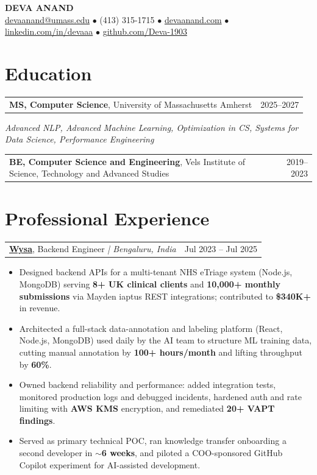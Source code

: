 \documentclass[letterpaper,11pt]{article}
\makeatletter
\newcommand{\eduItem}[3]{%
  \begin{tabular*}{\textwidth}{@{}l@{\extracolsep{\fill}}r@{}}
    \textbf{#1}, #2 & #3 \\
  \end{tabular*}\par
}
\newcommand{\expItem}[4]{%
  \vspace{3pt}
  \begin{tabular*}{\textwidth}{@{}l@{\extracolsep{\fill}}r@{}}
    \textbf{#1}, #2 \textit{| #3} & #4 \\
  \end{tabular*}\par\vspace{-2pt}
}
\makeatother
\begin{document}
\begin{center}
    {\fontsize{18}{20}\selectfont\bfseries DEVA ANAND}\\ \vspace{3pt}
    {\small
    \href{mailto:devaanand@umass.edu}{devaanand@umass.edu}
    \enspace$\bullet$\enspace
    (413) 315-1715
    \enspace$\bullet$\enspace
    \href{https://devaanand.com}{devaanand.com}
    \enspace$\bullet$\enspace
    \href{https://linkedin.com/in/devaaa/}{linkedin.com/in/devaaa}
    \enspace$\bullet$\enspace
    \href{https://github.com/Deva-1903}{github.com/Deva-1903}}
\end{center}
\vspace{-6pt}

\section{Education}
\eduItem{MS, Computer Science}{University of Massachusetts Amherst}{2025--2027}
{\small\textit{Advanced NLP, Advanced Machine Learning, Optimization in CS, Systems for Data Science, Performance Engineering}}\par
\vspace{3pt}
\eduItem{BE, Computer Science and Engineering}{Vels Institute of Science, Technology and Advanced Studies}{2019--2023}

\section{Professional Experience}

\expItem{\href{https://www.wysa.io}{Wysa}}{Backend Engineer}{Bengaluru, India}{Jul 2023 -- Jul 2025}
\begin{itemize}
  \item Designed backend APIs for a multi-tenant NHS eTriage system (Node.js, MongoDB) serving \textbf{8+ UK clinical clients} and \textbf{10{,}000+ monthly submissions} via Mayden iaptus REST integrations; contributed to \textbf{\$340K+} in revenue.
  \item Architected a full-stack data-annotation and labeling platform (React, Node.js, MongoDB) used daily by the AI team to structure ML training data, cutting manual annotation by \textbf{100+ hours/month} and lifting throughput by \textbf{60\%}.
  \item Owned backend reliability and performance: added integration tests, monitored production logs and debugged incidents, hardened auth and rate limiting with \textbf{AWS KMS} encryption, and remediated \textbf{20+ VAPT findings}.
  \item Served as primary technical POC, ran knowledge transfer onboarding a second developer in \textbf{$\sim$6 weeks}, and piloted a COO-sponsored GitHub Copilot experiment for AI-assisted development.
\end{itemize}
\end{document}
